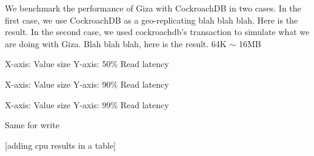 We benchmark the performance of Giza with CockroachDB in two cases. In the first case, we use CockroachDB as a geo-replicating blah blah blah. Here is the result.
In the second case, we used cockroachdb's transaction to simulate what we are doing with Giza. Blah blah blah, here is the result.
64K $\sim$ 16MB

X-axis: Value size
Y-axis: 50\% Read latency

X-axis: Value size
Y-axis: 90\% Read latency

X-axis: Value size
Y-axis: 99\% Read latency

Same for write

[adding cpu results in a table]











